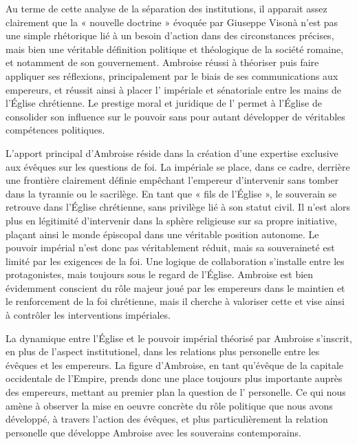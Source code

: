 Au terme de cette analyse de la séparation des institutions, il apparait assez clairement que la « nouvelle doctrine » évoquée par Giuseppe Visonà n'est pas une simple rhétorique lié à un besoin d'action dans des circonstances précises, mais bien une véritable définition politique et théologique de la société romaine, et notamment de son gouvernement. Ambroise réussi à théoriser puis faire appliquer ses réflexions, principalement par le biais de ses communications aux empereurs, et réussit ainsi à placer l' impériale et sénatoriale entre les mains de l'Église chrétienne. Le prestige moral et juridique de l' permet à l'Église de consolider son influence sur le pouvoir sans pour autant développer de véritables compétences politiques.

\bigskip

L'apport principal d'Ambroise réside dans la création d'une expertise exclusive aux évêques sur les questions de foi. La  impériale se place, dans ce cadre, derrière une frontière clairement définie empêchant l'empereur d'intervenir sans tomber dans la tyrannie ou le sacrilège. En tant que « fils de l'Église », le souverain se retrouve dans l'Église chrétienne, sans privilège lié à son statut civil. Il n'est alors plus en légitimité d'intervenir dans la sphère religieuse sur sa propre initiative, plaçant ainsi le monde épiscopal dans une véritable position autonome. Le pouvoir impérial n'est donc pas véritablement réduit, mais sa souveraineté est limité par les exigences de la foi. Une logique de collaboration s'installe entre les protagonistes, mais toujours sous le regard de l'Église. Ambroise est bien évidemment conscient du rôle majeur joué par les empereurs dans le maintien et le renforcement de la foi chrétienne, mais il cherche à valoriser cette  et vise ainsi à contrôler les interventions impériales.

\bigskip

La dynamique entre l'Église et le pouvoir impérial théorisé par Ambroise s'inscrit, en plus de l'aspect institutionel, dans les relations plus personelle entre les évêques et les empereurs. La figure d'Ambroise, en tant qu'évêque de la capitale occidentale de l'Empire, prends donc une place toujours plus importante auprès des empereurs, mettant au premier plan la question de l' personelle. Ce qui nous amène à observer la mise en oeuvre concrète du rôle politique que nous avons développé, à travers l'action des évêques, et plus particulièrement la relation personelle que développe Ambroise avec les souverains contemporains.

